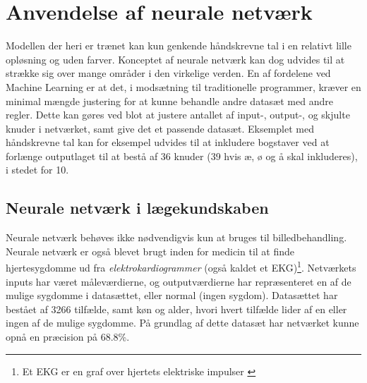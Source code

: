 \documentclass[../SOP.tex]{subfile}
\begin{document}
\section{Anvendelse af neurale netværk}
Modellen der heri er trænet kan kun genkende håndskrevne tal i en relativt lille opløsning og uden farver. Konceptet af neurale netværk kan dog udvides til at strække sig over mange områder i den virkelige verden. En af fordelene ved Machine Learning er at det, i modsætning til traditionelle programmer, kræver en minimal mængde justering for at kunne behandle andre datasæt med andre regler. Dette kan gøres ved blot at justere antallet af input-, output-, og skjulte knuder i netværket, samt give det et passende datasæt.
Eksemplet med håndskrevne tal kan for eksempel udvides til at inkludere bogstaver ved at forlænge outputlaget til at bestå af 36 knuder (39 hvis æ, ø og å skal inkluderes), i stedet for 10.
\subsection{Neurale netværk i lægekundskaben}
Neurale netværk behøves ikke nødvendigvis kun at bruges til billedbehandling. Neurale netværk er også blevet brugt inden for medicin til at finde hjertesygdomme ud fra \emph{elektrokardiogrammer} (også kaldet et EKG)\footnote{Et EKG er en graf over hjertets elektriske impulser \parencite{ekg}}. Netværkets inputs har været måleværdierne, og outputværdierne har repræsenteret en af de mulige sygdomme i datasættet, eller normal (ingen sygdom). Datasættet har bestået af 3266 tilfælde, samt køn og alder, hvori hvert tilfælde lider af en eller ingen af de mulige sygdomme. På grundlag af dette datasæt har netværket kunne opnå en præcision på 68.8\%. \parencite{ecg}
\end{document}
